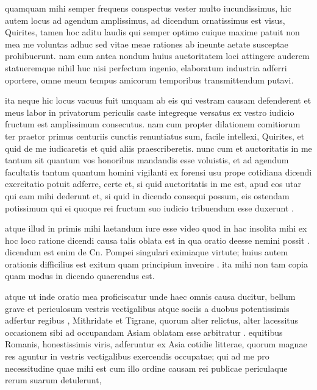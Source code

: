 
 quamquam mihi semper frequens conspectus vester multo iucundissimus, hic autem locus ad agendum amplissimus, ad dicendum ornatissimus est visus, Quirites, tamen hoc aditu laudis qui semper optimo cuique maxime patuit non mea me voluntas adhuc sed vitae meae rationes ab ineunte aetate susceptae prohibuerunt. nam cum antea nondum huius auctoritatem loci attingere auderem statueremque nihil huc nisi perfectum ingenio, elaboratum industria adferri oportere, omne meum tempus amicorum temporibus transmittendum putavi.

 ita neque hic locus vacuus fuit umquam ab eis qui vestram causam defenderent et meus labor in privatorum periculis caste integreque versatus ex vestro iudicio fructum est amplissimum consecutus. nam cum propter dilationem comitiorum ter praetor primus centuriis cunctis renuntiatus sum, facile intellexi, Quirites, et quid de me iudicaretis et quid aliis praescriberetis. nunc cum et auctoritatis in me tantum sit quantum vos honoribus mandandis esse voluistis, et ad agendum facultatis tantum quantum homini vigilanti ex forensi usu prope cotidiana dicendi exercitatio potuit adferre, certe et, si quid auctoritatis in me est, apud eos utar qui eam mihi dederunt et, si quid in dicendo consequi possum, eis ostendam potissimum qui ei quoque rei fructum suo iudicio tribuendum esse duxerunt .

 atque illud in primis mihi laetandum iure esse video quod in hac insolita mihi ex hoc loco ratione dicendi causa talis oblata est in qua oratio deesse nemini possit . dicendum est enim de Cn. Pompei singulari eximiaque virtute; huius autem orationis difficilius est exitum quam principium invenire . ita mihi non tam copia quam modus in dicendo quaerendus est.

 atque ut inde oratio mea proficiscatur unde haec omnis causa ducitur, bellum grave et periculosum vestris vectigalibus atque sociis a duobus potentissimis adfertur regibus , Mithridate et Tigrane, quorum alter relictus, alter lacessitus occasionem sibi ad occupandam Asiam oblatam esse arbitratur . equitibus Romanis, honestissimis viris, adferuntur ex Asia cotidie litterae, quorum magnae res aguntur in vestris vectigalibus exercendis occupatae; qui ad me pro necessitudine quae mihi est cum illo ordine causam rei publicae periculaque rerum suarum detulerunt,

